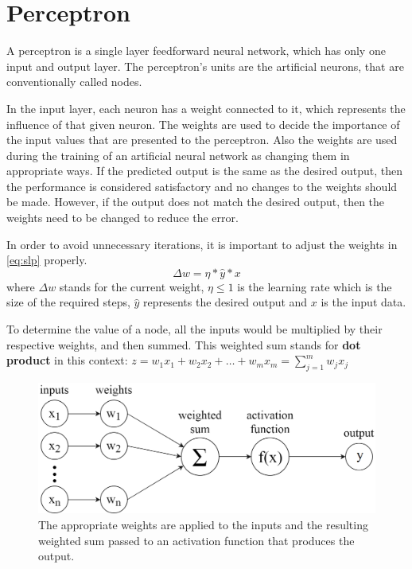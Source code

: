 \section{Perceptron}

A perceptron \cite{tho2010perceptron} is a single layer feedforward neural network, which has only one input and output layer. The perceptron's units are the artificial neurons, that are conventionally called nodes.\smallskip

In the input layer, each neuron has a weight connected to it, which represents the influence of that given neuron. The weights are used to decide the importance of the input values that are presented to the perceptron. Also the weights are used during the training of an artificial neural network as changing them in appropriate ways. If the predicted output is the same as the desired output, then the performance is considered satisfactory and no changes to the weights should be made. However, if the output does not match the desired output, then the weights need to be changed to reduce the error. \medskip

In order to avoid unnecessary iterations, it is important to adjust the weights in \autoref{eq:slp} properly.
\begin{equation} \Delta w = \eta * \hat{y} * x \label{eq:slp} \end{equation} 
where $\Delta w$ stands for the current weight, $\eta \leq 1$ is the learning rate which is the size of the required steps, $\hat{y}$ represents the desired output and $x$ is the input data. \medskip

To determine the value of a node, all the inputs would be multiplied by their respective weights, and then summed. This weighted sum stands for \textbf{dot product} in this context: $ z = w_1 x_1 + w_2 x_2 + \dots + w_m x_m = \sum_{j=1}^m w_j x_j $

\begin{figure}[h]
	\centering
	\includegraphics[height=0.28\linewidth]{./figures/perceptron}
	\caption{The appropriate weights are applied to the inputs and the resulting weighted sum passed to an activation function that produces the output.}
	\label{fig:perceptron}
\end{figure}

